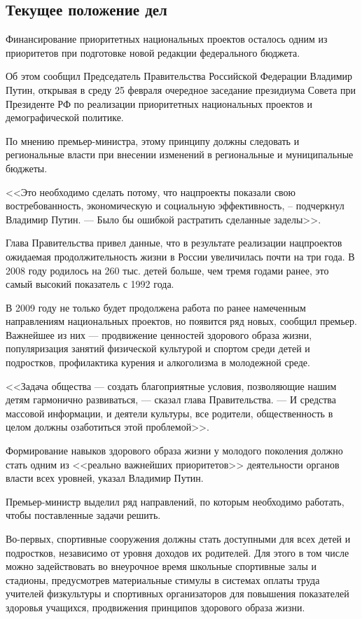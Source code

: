 \documentclass[article, 12pt, russian, oneside]{ncc}
\begin{document}
\subsection{Текущее положение дел}

Финансирование приоритетных национальных проектов осталось одним из
приоритетов при подготовке новой редакции федерального
бюджета\cite{Health_Waitings}.

Об этом сообщил Председатель Правительства Российской Федерации
Владимир Путин, открывая в среду 25 февраля очередное заседание
президиума Совета при Президенте РФ по реализации приоритетных
национальных проектов и демографической политике.

По мнению премьер-министра, этому принципу должны следовать и
региональные власти при внесении изменений в региональные и
муниципальные бюджеты.

<<Это необходимо сделать потому, что нацпроекты показали свою
востребованность, экономическую и социальную эффективность, –
подчеркнул Владимир Путин. --- Было бы ошибкой растратить сделанные
заделы>>.

Глава Правительства привел данные, что в результате реализации
нацпроектов ожидаемая продолжительность жизни в России увеличилась
почти на три года. В 2008 году родилось на 260 тыс. детей больше, чем
тремя годами ранее, это самый высокий показатель с 1992 года.

В 2009 году не только будет продолжена работа по ранее намеченным
направлениям национальных проектов, но появится ряд новых, сообщил
премьер. Важнейшее из них --- продвижение ценностей здорового образа
жизни, популяризация занятий физической культурой и спортом среди
детей и подростков, профилактика курения и алкоголизма в молодежной
среде.

<<Задача общества --- создать благоприятные условия, позволяющие нашим
детям гармонично развиваться, --- сказал глава Правительства. --- И
средства массовой информации, и деятели культуры, все родители,
общественность в целом должны озаботиться этой проблемой>>.

Формирование навыков здорового образа жизни у молодого поколения
должно стать одним из <<реально важнейших приоритетов>> деятельности
органов власти всех уровней, указал Владимир Путин.

Премьер-министр выделил ряд направлений, по которым необходимо
работать, чтобы поставленные задачи решить.

Во-первых, спортивные сооружения должны стать доступными для всех
детей и подростков, независимо от уровня доходов их родителей. Для
этого в том числе можно задействовать во внеурочное время школьные
спортивные залы и стадионы, предусмотрев материальные стимулы в
системах оплаты труда учителей физкультуры и спортивных организаторов
для повышения показателей здоровья учащихся, продвижения принципов
здорового образа жизни.
\end{document}
